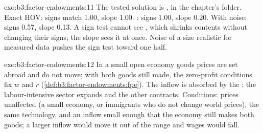 \begin{solution}{exo:b3:factor-endowments:11}
The tested solution is , in the chapter's 
folder. Exact HOV: signs match 1.00, slope 1.00. : signs 1.00, slope
0.20. With noise: signs 0.57, slope 0.13. %
A sign test cannot see , which shrinks contents without changing
their signs; the slope sees it at once. Noise of a size realistic for measured
data pushes the sign test toward one half.
\end{solution}

\begin{solution}{exo:b3:factor-endowments:12}
In a small open economy goods prices are set abroad and do not move; with both
goods still made, the zero-profit conditions fix $w$ and $r$
(\cref{def:b3:factor-endowments:fpe}). The inflow is absorbed by the : the labour-intensive sector expands and the other contracts. Conditions:
prices unaffected (a small economy, or immigrants who do not change world
prices), the same technology, and an inflow small enough that the economy still
makes both goods; a larger inflow would move it out of the range and wages
would fall.
\end{solution}

